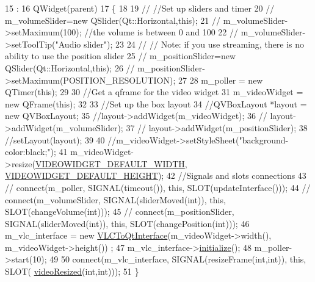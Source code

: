 \begin{DoxyCode}
15                                               :
16     QWidget(parent)
17 \{
18 
19 \textcolor{comment}{//    //Set up sliders and timer}
20 \textcolor{comment}{//    m\_volumeSlider=new QSlider(Qt::Horizontal,this);}
21 \textcolor{comment}{//    m\_volumeSlider->setMaximum(100); //the volume is between 0 and 100}
22 \textcolor{comment}{//    m\_volumeSlider->setToolTip("Audio slider");}
23 
24 \textcolor{comment}{//    // Note: if you use streaming, there is no ability to use the position slider}
25 \textcolor{comment}{//    m\_positionSlider=new QSlider(Qt::Horizontal,this);}
26 \textcolor{comment}{//    m\_positionSlider->setMaximum(POSITION\_RESOLUTION);}
27 
28     m\_poller = \textcolor{keyword}{new} QTimer(\textcolor{keyword}{this});
29 
30     \textcolor{comment}{//Get a qframe for the video widget}
31     m\_videoWidget = \textcolor{keyword}{new} QFrame(\textcolor{keyword}{this});
32 
33     \textcolor{comment}{//Set up the box layout}
34     \textcolor{comment}{//QVBoxLayout *layout = new QVBoxLayout;}
35     \textcolor{comment}{//layout->addWidget(m\_videoWidget);}
36 \textcolor{comment}{//    layout->addWidget(m\_volumeSlider);}
37 \textcolor{comment}{//    layout->addWidget(m\_positionSlider);}
38     \textcolor{comment}{//setLayout(layout);}
39 
40     \textcolor{comment}{//m\_videoWidget->setStyleSheet("background-color:black;");}
41     m\_videoWidget->resize(\hyperlink{vlcvideowidget_8h_a2deec7650a0c6caf3c17a5ddf36d6460}{VIDEOWIDGET\_DEFAULT\_WIDTH}, 
      \hyperlink{vlcvideowidget_8h_afea1bcfd5eabc718d60a92aee2cd7f50}{VIDEOWIDGET\_DEFAULT\_HEIGHT});
42     \textcolor{comment}{//Signals and slots connections}
43 \textcolor{comment}{//    connect(m\_poller, SIGNAL(timeout()), this, SLOT(updateInterface()));}
44 \textcolor{comment}{//    connect(m\_volumeSlider, SIGNAL(sliderMoved(int)), this, SLOT(changeVolume(int)));}
45 \textcolor{comment}{//    connect(m\_positionSlider, SIGNAL(sliderMoved(int)), this, SLOT(changePosition(int)));}
46     m\_vlc\_interface = \textcolor{keyword}{new} \hyperlink{classVLCToQtInterface}{VLCToQtInterface}(m\_videoWidget->width(), m\_videoWidget->height())
      ;
47     m\_vlc\_interface->\hyperlink{classVLCToQtInterface_aaf25e1804b120924ad8b49e36e2bfa8c}{initialize}();
48     m\_poller->start(10);
49 
50     connect(m\_vlc\_interface, SIGNAL(resizeFrame(\textcolor{keywordtype}{int},\textcolor{keywordtype}{int})), \textcolor{keyword}{this}, SLOT(
      \hyperlink{classVLCVideoWidget_aff4501569b0e46b3641625c3c9bbd5c6}{videoResized}(\textcolor{keywordtype}{int},\textcolor{keywordtype}{int})));
51 \}
\end{DoxyCode}
